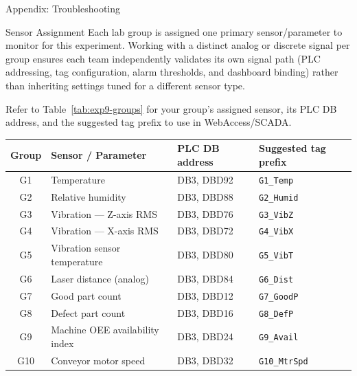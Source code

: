 \begin{labsection}{Appendix: Troubleshooting}{}
\begin{boxedfigure}
    \label{fig:exp9-pipeline}
  \end{boxedfigure}

  \begin{labsection}{Sensor Assignment}{}
    Each lab group is assigned one primary sensor/parameter to monitor for this experiment. Working with a distinct analog or discrete signal per group ensures each team independently validates its own signal path (PLC addressing, tag configuration, alarm thresholds, and dashboard binding) rather than inheriting settings tuned for a different sensor type.

    Refer to Table~\ref{tab:exp9-groups} for your group's assigned sensor, its PLC DB address, and the suggested tag prefix to use in WebAccess/SCADA.
    \newpage

    \begin{boxedtable}
      \label{tab:exp9-groups}
      \centering
      {\renewcommand{\arraystretch}{1.3}
        \begin{tabular}{clll}
          \toprule
          Group & Sensor / Parameter             & PLC DB address & Suggested tag prefix \\
          \midrule
          G1    & Temperature                    & DB3, DBD92     & \texttt{G1\_Temp}    \\
          G2    & Relative humidity              & DB3, DBD88     & \texttt{G2\_Humid}   \\
          G3    & Vibration --- Z-axis RMS       & DB3, DBD76     & \texttt{G3\_VibZ}    \\
          G4    & Vibration --- X-axis RMS       & DB3, DBD72     & \texttt{G4\_VibX}    \\
          G5    & Vibration sensor temperature   & DB3, DBD80     & \texttt{G5\_VibT}    \\
          G6    & Laser distance (analog)        & DB3, DBD84     & \texttt{G6\_Dist}    \\
          G7    & Good part count                & DB3, DBD12     & \texttt{G7\_GoodP}   \\
          G8    & Defect part count              & DB3, DBD16     & \texttt{G8\_DefP}    \\
          G9    & Machine OEE availability index & DB3, DBD24     & \texttt{G9\_Avail}   \\
          G10   & Conveyor motor speed           & DB3, DBD32     & \texttt{G10\_MtrSpd} \\
          \bottomrule
        \end{tabular}
      }
    \end{boxedtable}


\end{labsection}
\end{labsection}
